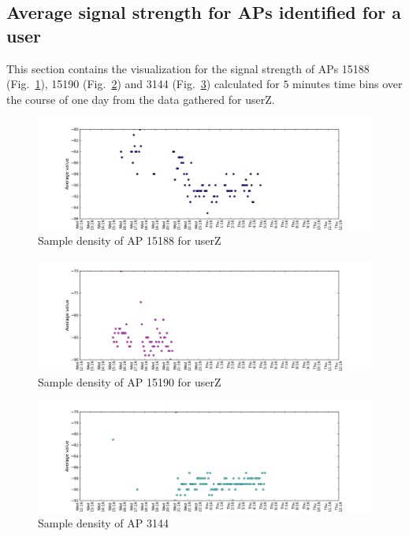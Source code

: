 \subsection{Average signal strength for APs identified for a user}
\label{appendix_avg_signal}

This section contains the visualization for the signal strength of APs 15188
(Fig.~\ref{avg_6_2nd_day_1}), 15190 (Fig.~\ref{avg_6_2nd_day_2}) and 3144
(Fig.~\ref{avg_6_2nd_day_3}) calculated for $5$ minutes time bins over the
course of one day from the data gathered for userZ.

\begin{figure}[!h]
\centering
\includegraphics[width =\textwidth]{figures/combinations/user_6_sorted_1days_plot_15188_avg_sig.png}
\caption{Sample density of AP 15188 for userZ}
\label{avg_6_2nd_day_1}
\end{figure}

\begin{figure}[!h]
\centering
\includegraphics[width =\textwidth]{figures/combinations/user_6_sorted_1days_plot_15190_avg_sig.png}
\caption{Sample density of AP 15190 for userZ}
\label{avg_6_2nd_day_2}
\end{figure}

\begin{figure}[!h]
\centering
\includegraphics[width =\textwidth]{figures/combinations/user_6_sorted_1days_plot_3144_avg_sig.png}
\caption{Sample density of AP 3144}
\label{avg_6_2nd_day_3}
\end{figure}

